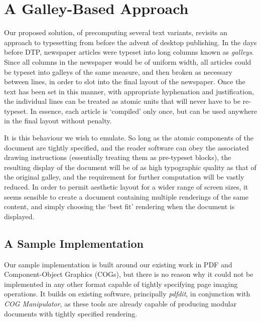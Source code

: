 

\section{A Galley-Based Approach}
\label{solution}
Our proposed solution, of precomputing several text variants, revisits an approach to typesetting
from before the advent of desktop publishing. In the days before DTP, newspaper articles were
typeset into long columns known as \emph{galleys}. Since all columns in the newspaper would be of
uniform width, all articles could be typeset into galleys of the same measure, and then broken as
necessary between lines, in order to slot into the final layout of the newspaper. Once the text has
been set in this manner, with appropriate hyphenation and justification, the individual lines can be
treated as atomic units that will never have to be re-typeset. In essence, each article is
`compiled' only once, but can be used anywhere in the final layout without penalty.


It is this behaviour we wish to emulate. So long as the atomic components of the document are
tightly specified, and the reader software can obey the associated drawing instructions (essentially
treating them as pre-typeset blocks), the resulting display of the document will be of as high
typographic quality as that of the original galley, and the requirement for further computation will
be vastly reduced. In order to permit aesthetic layout for a wider range of screen sizes, it seems
sensible to create a document containing multiple renderings of the same content, and simply
choosing the `best fit' rendering when the document is displayed.




\subsection{A Sample Implementation}
Our sample implementation is built around our existing work in PDF and Component-Object Graphics
(COGs)\cite{Bagley2003}, but there is no reason why it could not be implemented in any other format
capable of tightly specifying page imaging operations. It builds on existing software, principally
\emph{pdfdit}, in conjunction with \emph{COG Manipulator}, as these tools are already capable of
producing modular documents with tightly specified rendering.


